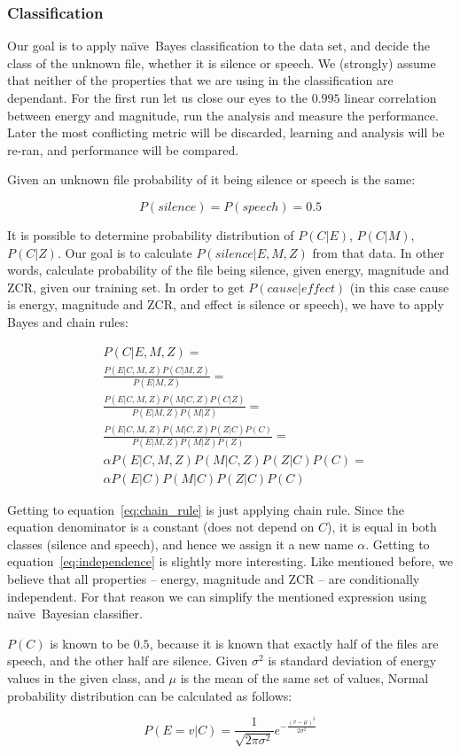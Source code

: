 \documentclass[english,11pt]{article}
\newcommand{\naive}{na\"{\i}ve\ }
\begin{document}
\subsubsection{Classification}

Our goal is to apply \naive Bayes classification to the data set, and decide
the class of the unknown file, whether it is silence or speech. We (strongly)
assume that neither of the properties that we are using in the classification
are dependant. For the first run let us close our eyes to the $0.995$ linear
correlation between energy and magnitude, run the analysis and measure the
performance. Later the most conflicting metric will be discarded, learning and
analysis will be re-ran, and performance will be compared.

Given an unknown file probability of it being silence or speech is the same:

$$ P(silence) = P(speech) = 0.5 $$

It is possible to determine probability distribution of $P(C|E)$, $P(C|M)$,
$P(C|Z)$. Our goal is to calculate $ P(silence | E, M, Z) $ from that data. In
other words, calculate probability of the file being silence, given energy,
magnitude and ZCR, given our training set. In order to get $P(cause|effect)$
(in this case cause is energy, magnitude and ZCR, and effect is silence or
speech), we have to apply Bayes and chain rules:

\begin{align}
   & P(C | E, M, Z) = \\
   & \frac{ P(E|C,M,Z) P(C|M,Z) }{ P(E|M,Z) } = \\
   & \frac{ P(E|C,M,Z) P(M|C,Z) P(C|Z) }{ P(E|M,Z) P(M|Z) } = \\
   & \frac{ P(E|C,M,Z) P(M|C,Z) P(Z|C) P(C) }{ P(E|M,Z) P(M|Z) P(Z) } =
    \label{eq:chain_rule} \\
   & \alpha P(E|C,M,Z) P(M|C,Z) P(Z|C) P(C) = \label{eq:alpha} \\
   & \alpha P(E|C) P(M|C) P(Z|C) P(C) \label{eq:independence}
\end{align}

Getting to equation~\ref{eq:chain_rule} is just applying chain rule. Since the
equation denominator is a constant (does not depend on $C$), it is equal in
both classes (silence and speech), and hence we assign it a new name $\alpha$.
Getting to equation~\ref{eq:independence} is slightly more interesting. Like
mentioned before, we believe that all properties -- energy, magnitude and ZCR
-- are conditionally independent. For that reason we can simplify the mentioned
expression using \naive Bayesian classifier.

$P(C)$ is known to be $0.5$, because it is known that exactly half of the files
are speech, and the other half are silence. Given $\sigma^{2}$ is standard
deviation of energy values in the given class, and $\mu$ is the mean of the
same set of values, Normal probability distribution can be calculated as
follows:

$$
P(E = v|C) = \frac{1}{\sqrt{2 \pi \sigma^{2}}}
e ^{- \frac{ (v - \mu)^2 }{2 \sigma^2} }
$$
\end{document}

